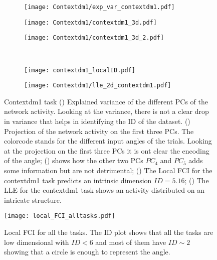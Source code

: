 \documentclass[11pt,a4paper]{article}
\begin{document}
\begin{figure}
 \centering
 \begin{subfigure}[b]{0.25\textwidth}
   \centering
   \texttt{[image: Contextdm1/exp\_var\_contextdm1.pdf]}
  \subcaption{}\label{fig:Contextdm1:exp_var_contextdm1}
 \end{subfigure}
 \begin{subfigure}[b]{0.30\textwidth}
   \centering
   \texttt{[image: Contextdm1/contextdm1\_3d.pdf]}
  \subcaption{}\label{fig:Contextdm1:contextdm1_3d}
 \end{subfigure}
 \begin{subfigure}[b]{0.40\textwidth}
   \centering
   \texttt{[image: Contextdm1/contextdm1\_3d\_2.pdf]}
  \subcaption{}\label{fig:Contextdm1:contextdm1_3d_2}
 \end{subfigure}\\
  \begin{subfigure}[b]{0.45\textwidth}
    \centering
    \texttt{[image: contextdm1\_localID.pdf]}
  \subcaption{}\label{fig:Contextdm1:hist2D_contextdm1_localFCI}
  \end{subfigure}
 \begin{subfigure}[b]{0.45\textwidth}
    \centering
    \texttt{[image: Contextdm1/lle\_2d\_contextdm1.pdf]}
  \subcaption{}\label{fig:Contextdm1:lle_2d_contextdm1}
  \end{subfigure}
 \caption{Contextdm1 task
() Explained variance of the different PCs of the network activity.
Looking at the variance, there is not a clear drop in variance that helps in identifying the ID of the dataset.
() Projection of the network activity on the first three PCs. The colorcode stands for the different input angles of the trials.
Looking at the projection on the first three PCs it is ont clear the encoding of the angle;
() shows how the other two PCs $PC_4$ and $PC_5$  adds some information but are not detrimental;
() The Local FCI for the contextdm1 task predicts an intrinsic dimension $ID=5.16$;
() The LLE for the contextdm1 task shows an activity distributed on an intricate structure.
 }\label{fig:Contextdm1}
\end{figure}



\begin{figure}
    \centering
    \texttt{[image: local\_FCI\_alltasks.pdf]}
    \caption{Local FCI for all the tasks.
    The ID plot shows that all the tasks are low dimensional with $ID<6$ and most of them have 
    $ID\sim 2$ showing that a circle is enough to represent the angle. 
    }\label{fig:local_FCI_alltasks}
\end{figure}
\end{document}
